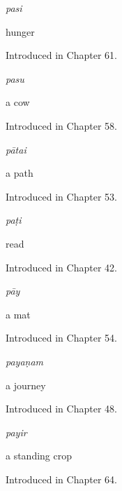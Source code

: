 \noindent\begin{minipage}[t]{\linewidth}
\raggedright
\textbf{}\enspace\emph{pasi}\par
\small hunger\par
\footnotesize Introduced in Chapter 61.
\end{minipage}\par\medskip

\noindent\begin{minipage}[t]{\linewidth}
\raggedright
\textbf{}\enspace\emph{pasu}\par
\small a cow\par
\footnotesize Introduced in Chapter 58.
\end{minipage}\par\medskip

\noindent\begin{minipage}[t]{\linewidth}
\raggedright
\textbf{}\enspace\emph{pātai}\par
\small a path\par
\footnotesize Introduced in Chapter 53.
\end{minipage}\par\medskip

\noindent\begin{minipage}[t]{\linewidth}
\raggedright
\textbf{}\enspace\emph{paṭi}\par
\small read\par
\footnotesize Introduced in Chapter 42.
\end{minipage}\par\medskip

\noindent\begin{minipage}[t]{\linewidth}
\raggedright
\textbf{}\enspace\emph{pāy}\par
\small a mat\par
\footnotesize Introduced in Chapter 54.
\end{minipage}\par\medskip

\noindent\begin{minipage}[t]{\linewidth}
\raggedright
\textbf{}\enspace\emph{payaṇam}\par
\small a journey\par
\footnotesize Introduced in Chapter 48.
\end{minipage}\par\medskip

\noindent\begin{minipage}[t]{\linewidth}
\raggedright
\textbf{}\enspace\emph{payir}\par
\small a standing crop\par
\footnotesize Introduced in Chapter 64.
\end{minipage}\par\medskip

